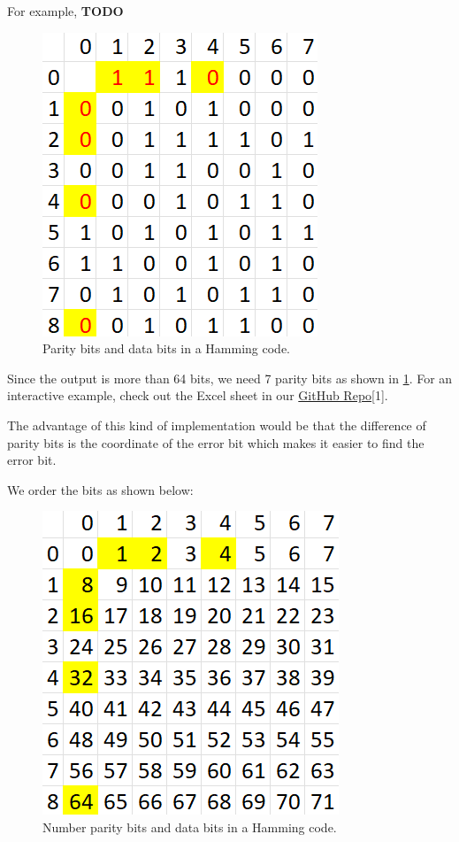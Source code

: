 \documentclass[conference]{IEEEtran}
\begin{document}
For example, \textbf{TODO}
\begin{figure}[htbp]
  \centerline{\includegraphics{Images/Hamming_example.png}}
  \caption{Parity bits and data bits in a Hamming code.}
  \label{fig_2}
\end{figure}

Since the output is more than 64 bits, we need 7 parity bits as shown in
\ref{fig_2}. For an interactive example, check out the Excel sheet in our
\href{https://github.com/luckunately/ELEC433-Projects}{GitHub Repo}[1]. %

The advantage of this kind of implementation would be that the difference of
parity bits is the coordinate of the error bit which makes it easier to find
the error bit.

We order the bits as shown below:

\begin{figure}[htbp]
  \centerline{\includegraphics{Images/Hamming_bits_order.png}}
  \caption{Number parity bits and data bits in a Hamming code.}
  \label{fig_3}
\end{figure}
\end{document}
